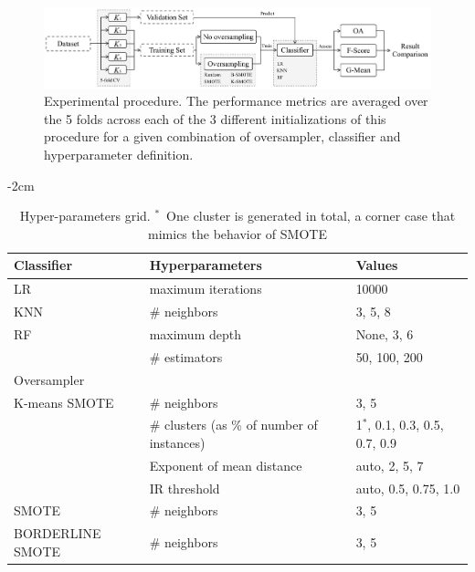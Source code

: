 \documentclass[authoryear,preprint,12pt]{elsarticle}
\begin{document}
\begin{linenumbers}
\begin{figure}
	\centering
    \captionsetup{justification=centering}
    \caption{Experimental procedure. The performance metrics are averaged over
    the 5 folds across each of the 3 different initializations of this
    procedure for a given combination of oversampler, classifier and
    hyperparameter definition.
    \vspace{.25cm}}\label{fig:experiment_pipeline}
	\includegraphics[width=1\linewidth]{../analysis/experiment_pipeline}
\end{figure}

\begin{table}
	\centering
    \addtolength{\leftskip} {-2cm}
    \addtolength{\rightskip}{-2cm}
    \captionsetup{justification=centering}
    \caption{Hyper-parameters grid. $^*$~One cluster is generated in total, a
    corner case that mimics the behavior of SMOTE
    }\label{tab:grid}
    \begin{tabular}{lll}
		\toprule
		Classifier       & Hyperparameters      & Values                            \\
		\midrule
		LR               & maximum iterations   & 10000                             \\
		KNN              & \# neighbors  & {3, 5, 8}                            \\
		RF               & maximum depth        & {None, 3, 6}                      \\
		                 & \# estimators & {50, 100, 200}                         \\
		\toprule
		Oversampler      &                      &                                   \\
		\midrule
        K-means SMOTE    & \# neighbors  & {3, 5}                            \\
		                 & \# clusters (as \% of number of instances)   & {1$^*$, 0.1, 0.3, 0.5, 0.7, 0.9}      \\
                         & Exponent of mean distance & {auto, 2, 5, 7}       \\
                         & IR threshold  & {auto, 0.5, 0.75, 1.0}            \\
		SMOTE            & \# neighbors  & {3, 5}                            \\
		BORDERLINE SMOTE & \# neighbors  & {3, 5}                            \\
		\bottomrule
	\end{tabular}
\end{table}


\end{linenumbers}
\end{document}
